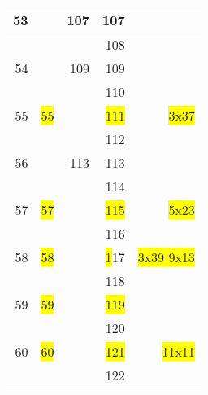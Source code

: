\begin{tabular}{|r|r|r|r|r|}
    \hline               53             &                        &    107  &    107    &                                \\
    \hline                              &                        &         &    108    &                                \\
    \hline               54             &                        &    109  &    109    &                                \\
    \hline                              &                        &         &    110    &                                \\
    \hline               55             &   \colorbox{yellow}{55}&         &    \colorbox{yellow}{111}    &     \colorbox{yellow}{3x37  }  \\
    \hline                              &                        &         &    112    &                                \\
    \hline               56             &                        &    113  &    113    &                                \\
    \hline                              &                        &         &    114    &                                \\
    \hline               57             &   \colorbox{yellow}{57}&         &    \colorbox{yellow}{115}    &     \colorbox{yellow}{5x23  }  \\
    \hline                              &                        &         &    116    &                                \\
    \hline               58             &   \colorbox{yellow}{58}&         &    \colorbox{yellow}117    &   \colorbox{yellow}{3x39 9x13} \\
    \hline                              &                        &         &    118    &                                \\
    \hline               59             &   \colorbox{yellow}{59}&         &    \colorbox{yellow}{119}    &                                \\
    \hline                              &                        &         &    120    &                                \\
    \hline               60             &   \colorbox{yellow}{60}&         &    \colorbox{yellow}{121}    &     \colorbox{yellow}{11x11  } \\
    \hline                              &                        &         &    122    &                                \\

\end{tabular}
